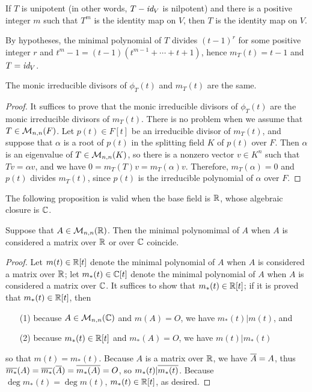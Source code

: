 \begin{prob}
    If $T$ is unipotent (in other words, $T-\textit{id}_{V}$ is nilpotent) and there is a positive integer $m$ such that $T^m$ is the identity map on $V$, then $T$ is the identity map on $V$.
\end{prob}
\begin{sol}
    By hypotheses, the minimal polynomial of $T$ divides $(t-1)^r$ for some positive integer $r$ and $t^m-1=(t-1)(t^{m-1}+\cdots+t+1)$, hence $m_T(t)=t-1$ and $T=\textit{id}_{V}$.
\end{sol}

\begin{prop}
    The monic irreducible divisors of $\phi_T(t)$ and $m_T(t)$ are the same.
\end{prop}
\begin{proof}
    It suffices to prove that the monic irreducible divisors of $\phi_T(t)$ are the monic irreducible divisors of $m_T(t)$.
    There is no problem when we assume that $T\in{\mathcal{M}}_{n, n}(F)$.
    Let $p(t)\in F[t]$ be an irreducible divisor of $m_T(t)$, and suppose that $\alpha$ is a root of $p(t)$ in the splitting field $K$ of $p(t)$ over $F$.
    Then $\alpha$ is an eigenvalue of $T\in{\mathcal{M}}_{n, n}(K)$, so there is a nonzero vector $v\in K^n$ such that $Tv=\alpha v$, and we have $0=m_T(T)v=m_T(\alpha)v$.
    Therefore, $m_T(\alpha)=0$ and $p(t)$ divides $m_T(t)$, since $p(t)$ is the irreducible polynomial of $\alpha$ over $F$.
\end{proof}

The following proposition is valid when the base field is ${\mathbb{R}}$, whose algebraic closure is ${\mathbb{C}}$.
\begin{prop}
    Suppose that $A\in{\mathcal{M}}_{n, n}({\mathbb{R}})$.
    Then the minimal polynomimal of $A$ when $A$ is considered a matrix over ${\mathbb{R}}$ or over ${\mathbb{C}}$ coincide.
\end{prop}
\begin{proof}
    Let $m(t)\in {\mathbb{R}}[t]$ denote the minimal polynomial of $A$ when $A$ is considered a matrix over ${\mathbb{R}}$; let $m_*(t)\in {\mathbb{C}}[t]$ denote the minimal polynomial of $A$ when $A$ is considered a matrix over ${\mathbb{C}}$.
    It suffices to show that $m_*(t)\in{\mathbb{R}}[t]$; if it is proved that $m_*(t)\in{\mathbb{R}}[t]$, then
    \begin{enumerate}
        \item[(1)]
        {
            because $A\in{\mathcal{M}}_{n, n}({\mathbb{C}})$ and $m(A)=O$, we have $m_*(t)|m(t)$, and
        }
        \item[(2)]
        {
            because $m_*(t)\in{\mathbb{R}}[t]$ and $m_*(A)=O$, we have $m(t)|m_*(t)$
        }
    \end{enumerate}
    so that $m(t)=m_*(t)$.
    Because $A$ is a matrix over ${\mathbb{R}}$, we have $\overline{A}=A$, thus $\overline{m_*}(A)=\overline{m_*}(\overline{A})=\overline{m_*(A)}=O$, so $m_*(t)|\overline{m_*(t)}$.
    Because $\deg m_*(t)=\deg m(t)$, $m_*(t)\in{\mathbb{R}}[t]$, as desired.
\end{proof}

